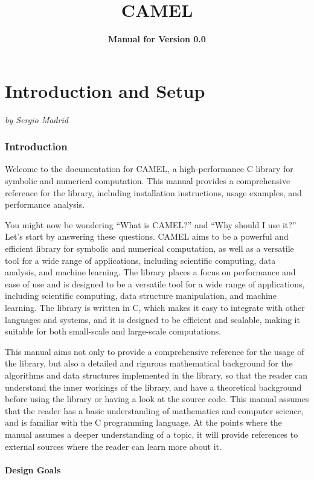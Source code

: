 \documentclass[a4paper,oneside,10pt]{article}
\title{\textbf{CAMEL}}
\author{\textbf{Manual for Version 0.0}}
\newcommand{\authoredpart}[2]{
  \clearpage
  \part{#1}
  \vspace{-1em} %
  \Large{\textit{by #2}}
  \vspace{2em} %
}
\theoremstyle{definition}
\begin{document}
\maketitle
\thispagestyle{empty}
\newpage

\tableofcontents
\newpage


\authoredpart{Introduction and Setup}{Sergio Madrid}

\section{Introduction}

Welcome to the documentation for CAMEL, a high-performance C library for symbolic and numerical computation. This manual provides a comprehensive reference for the library, including installation instructions, usage examples, and performance analysis.

You might now be wondering ``What is CAMEL?'' and ``Why should I use it?'' Let's start by answering these questions. CAMEL aims to be a powerful and efficient library for symbolic and numerical computation, as well as a versatile tool for a wide range of applications, including scientific computing, data analysis, and machine learning. The library places a focus on performance and ease of use and is designed to be a versatile tool for a wide range of applications, including scientific computing, data structure manipulation, and machine learning. The library is written in C, which makes it easy to integrate with other languages and systems, and it is designed to be efficient and scalable, making it suitable for both small-scale and large-scale computations.

This manual aims not only to provide a comprehensive reference for the usage of the library, but also a detailed and rigurous mathematical background for the algorithms and data structures implemented in the library, so that the reader can understand the inner workings of the library, and have a theoretical background before using the library or having a look at the source code. This manual assumes that the reader has a basic understanding of mathematics and computer science, and is familiar with the C programming language. At the points where the manual assumes a deeper understanding of a topic, it will provide references to external sources where the reader can learn more about it.

\subsection{Design Goals}
\end{document}

